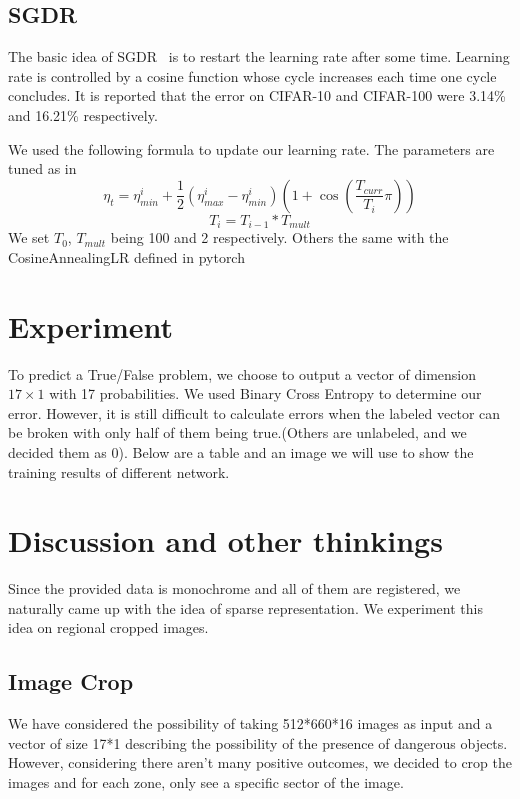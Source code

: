 \documentclass[conference,compsoc]{IEEEtran}
\begin{document}
\subsection{SGDR}
The basic idea of SGDR~\cite{SGDR} is to restart the learning rate after some time. Learning rate is controlled by a cosine function whose cycle increases each time one cycle concludes. It is reported that the error on CIFAR-10 and CIFAR-100 were 3.14\% and 16.21\% respectively.
\par We used the following formula to update our learning rate. The parameters are tuned as in \cite{SGDR}
$$ \eta_t = \eta_{min}^i + \frac{1}{2}(\eta_{max}^i-\eta_{min}^i)(1 + \cos(\frac{T_{curr}}{T_i}\pi))$$
$$ T_{i} = T_{i-1} * T_{mult} $$
We set $T_0$, $T_{mult}$ being 100 and 2 respectively. Others the same with the CosineAnnealingLR defined in pytorch


\section{Experiment}
To predict a True/False problem, we choose to output a vector of dimension $17 \times 1$ with 17 probabilities.
We used Binary Cross Entropy to determine our error. However, it is still difficult to calculate errors when the labeled vector can be broken with only half of them being true.(Others are unlabeled, and we decided them as 0).
Below are a table and an image we will use to show the training results of different network.

\section{Discussion and other thinkings}
Since the provided data is monochrome and all of them are registered, we naturally came up with the idea of sparse representation. We experiment this idea on regional cropped images.

\subsection{Image Crop}
We have considered the possibility of taking 512*660*16 images as input and a vector of size 17*1 describing the possibility of the presence of dangerous objects. However, considering there aren't many positive outcomes, we decided to crop the images and for each zone, only see a specific sector of the image.
\end{document}
